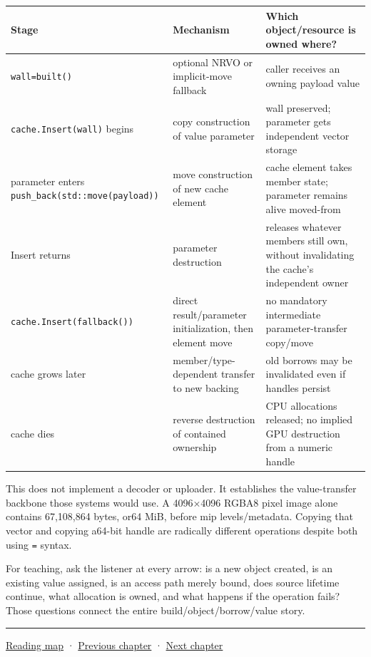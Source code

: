 {\def\LTcaptype{none} %
\begin{longtable}[]{@{}
  >{\raggedright\arraybackslash}p{}
  >{\raggedright\arraybackslash}p{}
  >{\raggedright\arraybackslash}p{}@{}}
\toprule\noalign{}
\begin{minipage}[b]{\linewidth}\raggedright
Stage
\end{minipage} & \begin{minipage}[b]{\linewidth}\raggedright
Mechanism
\end{minipage} & \begin{minipage}[b]{\linewidth}\raggedright
Which object/resource is owned where?
\end{minipage} \\
\midrule\noalign{}
\endhead
\bottomrule\noalign{}
\endlastfoot
\texttt{wall=built()} & optional NRVO or implicit-move fallback & caller receives an owning payload value \\
\texttt{cache.Insert(wall)} begins & copy construction of value parameter & wall preserved; parameter gets independent vector storage \\
parameter enters \texttt{push\_back(std::move(payload))} & move construction of new cache element & cache element takes member state; parameter remains alive moved-from \\
Insert returns & parameter destruction & releases whatever members still own, without invalidating the cache's independent owner \\
\texttt{cache.Insert(fallback())} & direct result/parameter initialization, then element move & no mandatory intermediate parameter-transfer copy/move \\
cache grows later & member/type-dependent transfer to new backing & old borrows may be invalidated even if handles persist \\
cache dies & reverse destruction of contained ownership & CPU allocations released; no implied GPU destruction from a numeric handle \\
\end{longtable}
}

This does not implement a decoder or uploader. It establishes the value-transfer backbone those systems would use. A 4096×4096 RGBA8 pixel image alone contains 67,108,864 bytes, or64 MiB, before mip levels/metadata. Copying that vector and copying a64-bit handle are radically different operations despite both using \texttt{=} syntax.

For teaching, ask the listener at every arrow: is a new object created, is an existing value assigned, is an access path merely bound, does source lifetime continue, what allocation is owned, and what happens if the operation fails? Those questions connect the entire build/object/borrow/value story.

\begin{center}\rule{0.5\linewidth}{0.5pt}\end{center}

\hyperref[volume-reading-map]{Reading map} · \hyperref[05-engine-i-ch002]{Previous chapter} · \hyperref[05-engine-i-ch004]{Next chapter}
